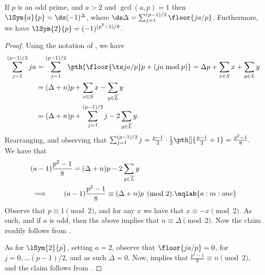 \begin{lemma}
    If $p$ is an odd prime, and $a>2$ and $\gcd(a, p)=1$ then
    $\lSym{a}{p} = \ds (-1)^\Delta$, where $\ds \Delta =
    \sum_{j=1}^{(p-1)/2} \floor{j a / p}$.  Furthermore, we have
    $\lSym{2}{p} = (-1)^{(p^2 - 1)/8}$.
\end{lemma}
\begin{proof}
    Using the notation of , we have
    \begin{align*}
        \sum_{j=1}^{(p-1)/2} j a %
        &=%
        \sum_{j=1}^{(p-1)/2} \pth{\biggl.\floor{\ts j a / p}p + (ja
           \bmod p)}%
        =%
        \Delta p + \sum_{x \in S} x + \sum_{y \in L} y\\
        &=%
        (\Delta+n) p + \sum_{x \in S} x - \sum_{y \in \overline{L}} y\\
        &=%
        (\Delta+n) p + \sum_{j=1}^{(p-1)/2} j - 2\sum_{y \in
           \overline{L}} y.%
    \end{align*}
    Rearranging, and observing that 
    \begin{math}
        \sum_{j=1}^{(p-1)/2} j%
        = \frac{p-1}{2}\cdot \frac{1}{2}\pth[]{\bigl. \frac{p-1}{2}
           +1} = \frac{p^2-1}{8}.
    \end{math}
     We have that 
     \begin{align}
         &(a-1) \frac{p^2-1}{8} = (\Delta+n) p - 2\sum_{y \in
            \overline{L}} y\nonumber\\
         &\implies \qquad %
         (a-1) \frac{p^2-1}{8} \equiv (\Delta+n) p \pmod{2}.%
         \eqlab{a:m:one}
     \end{align}
     Observe that $p \equiv 1 \pmod{2}$, and for any $x$ we have that
     $x \equiv -x \pmod{2}$.  As such, and if $a$ is odd, then the
     above implies that $n \equiv \Delta \pmod{2}$. Now the claim
     readily follows from .

     As for $\lSym{2}{p}$, setting $a=2$, observe that $\floor{j a /
        p} = 0$, for $j=0,\ldots (p-1)/2$, and as such $\Delta=0$.
     Now,  implies that
     \begin{math}
         \frac{p^2-1}{8} \equiv n \pmod{2},
     \end{math}
     and the claim follows from .
\end{proof}




